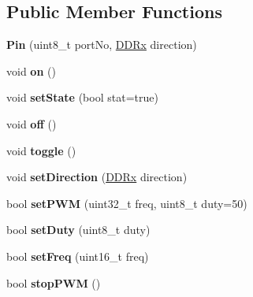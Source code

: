 \subsection*{Public Member Functions}
\begin{DoxyCompactItemize}
\item 
\mbox{\label{classPin_a5a77b8b0c99771c11582f0a011496e6b}} 
{\bfseries Pin} (uint8\+\_\+t port\+No, \mbox{\hyperlink{portmanager_8h_a63d6a5e91a2b1a4156b6c0466f828554}{D\+D\+Rx}} direction)
\item 
\mbox{\label{classPin_ae562d4913700a9af64086bc0bad95a28}} 
void {\bfseries on} ()
\item 
\mbox{\label{classPin_a2488d5db01d0bae6d5fe8932b39d3bbe}} 
void {\bfseries set\+State} (bool stat=true)
\item 
\mbox{\label{classPin_aa568e83b313f1b9f66bb50f66f18e62c}} 
void {\bfseries off} ()
\item 
\mbox{\label{classPin_a5ecffd86fb366af5ff559faf82a1fc81}} 
void {\bfseries toggle} ()
\item 
\mbox{\label{classPin_a49a4bc8df0fad82b4799fa19da708f12}} 
void {\bfseries set\+Direction} (\mbox{\hyperlink{portmanager_8h_a63d6a5e91a2b1a4156b6c0466f828554}{D\+D\+Rx}} direction)
\item 
\mbox{\label{classPin_ae3b0862a7ec9b11f7a8986024669e25a}} 
bool {\bfseries set\+P\+WM} (uint32\+\_\+t freq, uint8\+\_\+t duty=50)
\item 
\mbox{\label{classPin_a938a229474b8319ced9edbad488d6157}} 
bool {\bfseries set\+Duty} (uint8\+\_\+t duty)
\item 
\mbox{\label{classPin_a8610548d2ab0b531e4e0697ca09aeb0c}} 
bool {\bfseries set\+Freq} (uint16\+\_\+t freq)
\item 
\mbox{\label{classPin_a4ea18c4f3780b3af59406be5d0b5a176}} 
bool {\bfseries stop\+P\+WM} ()
\item 
\mbox{\label{classPin_ae04006b8dc5d6fb25ff4e2a781ba047d}} 

\end{DoxyCompactItemize}
